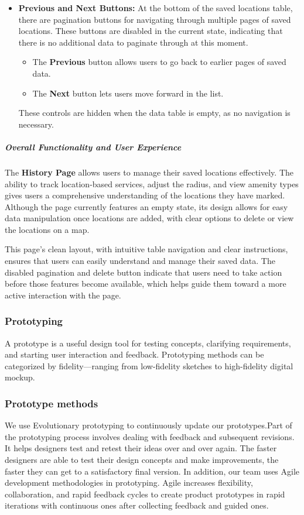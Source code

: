 \begin{itemize}
    \item{} \textbf{Previous and Next Buttons:} At the bottom of the saved locations table, there are pagination buttons for navigating through multiple pages of saved locations. These buttons are disabled in the current state, indicating that there is no additional data to paginate through at this moment.
    \begin{itemize}
        \item{} The \textbf{Previous} button allows users to go back to earlier pages of saved data.
        \item{} The \textbf{Next} button lets users move forward in the list.
    \end{itemize}
    These controls are hidden when the data table is empty, as no navigation is necessary.
\end{itemize}

\subparagraph{Overall Functionality and User Experience}\mbox{}

The \textbf{History Page} allows users to manage their saved locations effectively. The ability to track location{-}based services, adjust the radius, and view amenity types gives users a comprehensive understanding of the locations they have marked. Although the page currently features an empty state, its design allows for easy data manipulation once locations are added, with clear options to delete or view the locations on a map.

This page’s clean layout, with intuitive table navigation and clear instructions, ensures that users can easily understand and manage their saved data. The disabled pagination and delete button indicate that users need to take action before those features become available, which helps guide them toward a more active interaction with the page.\subsubsection{Prototyping}

A prototype is a useful design tool for testing concepts, clarifying requirements, and starting user interaction and feedback.
Prototyping methods can be categorized by fidelity—ranging from low-fidelity sketches to high-fidelity digital mockup.


\subsubsection{Prototype methods}
We use Evolutionary prototyping to continuously update our prototypes.Part of the prototyping process involves dealing with feedback and subsequent revisions. It helps designers test and retest their ideas over and over again. The faster designers are able to test their design concepts and make improvements, the faster they can get to a satisfactory final version. In addition, our team uses Agile development methodologies in prototyping. Agile increases flexibility, collaboration, and rapid feedback cycles to create product prototypes in rapid iterations with continuous ones after collecting feedback and guided ones.

